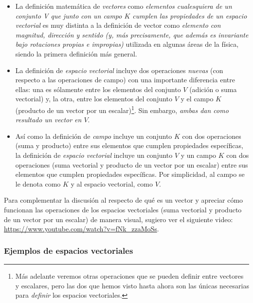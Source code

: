 \documentclass[12pt]{article}
\begin{document}
\begin{itemize}
    \item La definición matemática de \textit{vectores} como \textit{elementos cualesquiera de un conjunto V que \textemdash junto con un campo $K$\textemdash\hspace{0.5mm} cumplen las propiedades de un espacio vectorial} es muy distinta a la definición de vector como \textit{elemento con magnitud, dirección y sentido (y, más precisamente, que además es invariante bajo rotaciones propias e impropias)} utilizada en algunas áreas de la física, siendo la primera definición más general.
    \item La definición de \textit{espacio vectorial} incluye dos operaciones \textit{nuevas} (con respecto a las operaciones de campo) con una importante diferencia entre ellas: una es sólamente entre los elementos del conjunto $V$ (adición o suma vectorial) y, la otra, entre los elementos del conjunto $V$ y el campo $K$ (producto de un vector por un escalar)\footnote{Más adelante veremos otras operaciones que se pueden definir entre vectores y escalares, pero las dos que hemos visto hasta ahora son las únicas necesarias para \textit{definir} los espacios vectoriales.}. Sin embargo, \emph{ambas dan como resultado un vector en $V$}.
    \item Así como la definición de \textit{campo} incluye un conjunto $K$ con dos operaciones (suma y producto) entre sus elementos que cumplen propiedades específicas, la definición de \textit{espacio vectorial} incluye un conjunto $V$ y un campo $K$ con dos operaciones (suma vectorial y producto de un vector por un escalar) entre sus elementos que cumplen propiedades específicas. Por simplicidad, al campo se le denota como $K$ y al espacio vectorial, como $V$.
    
\end{itemize}{}

Para complementar la discusión al respecto de qué es un vector y apreciar cómo funcionan las operaciones de los espacios vectoriales (suma vectorial y producto de un vector por un escalar) de manera visual, sugiero ver el siguiente video: \url{https://www.youtube.com/watch?v=fNk_zzaMoSs}.

\subsubsection{Ejemplos de espacios vectoriales} \label{Ejem:Espacios_vectoriales}
\end{document}
